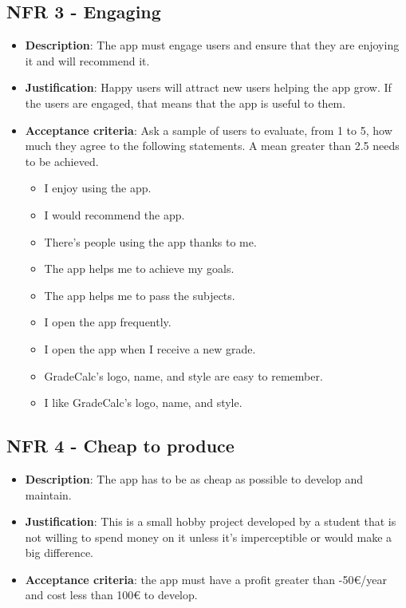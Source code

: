 \subsection*{NFR 3 - Engaging}
\begin{itemize}
    \item \textbf{Description}: The app must engage users and ensure that they are enjoying it and will recommend it.
    \item \textbf{Justification}: Happy users will attract new users helping the app grow. If the users are engaged, that means that the app is useful to them.
    \item \textbf{Acceptance criteria}: Ask a sample of users to evaluate, from 1 to 5, how much they agree to the following statements. A mean greater than 2.5 needs to be achieved.
    \begin{itemize}[noitemsep]
        \item I enjoy using the app.
        \item I would recommend the app.
        \item There's people using the app thanks to me.
        \item The app helps me to achieve my goals.
        \item The app helps me to pass the subjects.
        \item I open the app frequently.
        \item I open the app when I receive a new grade.
        \item GradeCalc's logo, name, and style are easy to remember.
        \item I like GradeCalc's logo, name, and style.
    \end{itemize}    
\end{itemize}

\subsection*{NFR 4 - Cheap to produce}
\begin{itemize}
    \item \textbf{Description}: The app has to be as cheap as possible to develop and maintain.
    \item \textbf{Justification}: This is a small hobby project developed by a student that is not willing to spend money on it unless it's imperceptible or would make a big difference.
    \item \textbf{Acceptance criteria}: the app must have a profit greater than -50€/year and cost less than 100€ to develop.
\end{itemize}

